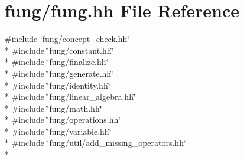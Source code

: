 \hypertarget{fung_8hh}{}\section{fung/fung.hh File Reference}
\label{fung_8hh}
{\ttfamily \#include \char`\"{}fung/concept\+\_\+check.\+hh\char`\"{}}\\*
{\ttfamily \#include \char`\"{}fung/constant.\+hh\char`\"{}}\\*
{\ttfamily \#include \char`\"{}fung/finalize.\+hh\char`\"{}}\\*
{\ttfamily \#include \char`\"{}fung/generate.\+hh\char`\"{}}\\*
{\ttfamily \#include \char`\"{}fung/identity.\+hh\char`\"{}}\\*
{\ttfamily \#include \char`\"{}fung/linear\+\_\+algebra.\+hh\char`\"{}}\\*
{\ttfamily \#include \char`\"{}fung/math.\+hh\char`\"{}}\\*
{\ttfamily \#include \char`\"{}fung/operations.\+hh\char`\"{}}\\*
{\ttfamily \#include \char`\"{}fung/variable.\+hh\char`\"{}}\\*
{\ttfamily \#include \char`\"{}fung/util/add\+\_\+missing\+\_\+operators.\+hh\char`\"{}}\\*
